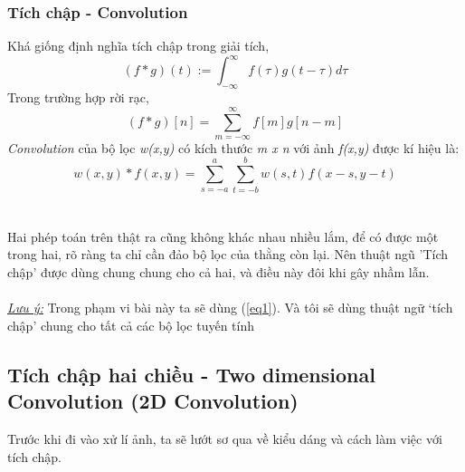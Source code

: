 \documentclass{article}
\begin{document}
        \subsubsection{Tích chập - Convolution}
        Khá giống định nghĩa tích chập trong giải tích, 
        $$(f \ast g)(t):=\int_{-\infty}^{\infty} f(\tau) g(t-\tau) d \tau$$
        Trong trường hợp rời rạc,
        $$(f \ast g)[n]=\sum_{m=-\infty}^{\infty} f[m] g[n-m]$$
        \textit{Convolution} của bộ lọc \textit{w(x,y)} có kích thước \textit{m x n} với ảnh \textit{f(x,y)} được kí hiệu là:
        $$w(x,y) \ast f(x,y) = \sum_{s=-a}^{a}\sum_{t=-b}^{b} w(s,t)f(x-s,y-t)$$
        \\ \\
        Hai phép toán trên thật ra cũng không khác nhau nhiều lắm, để có được một trong hai, rõ ràng ta chỉ cần đảo bộ lọc của thằng còn lại. Nên thuật ngũ 'Tích chập' được dùng chung chung cho cả hai, và điều này đôi khi gây nhầm lẫn.\\ \\
        \underline{\textit{Lưu ý:}} Trong phạm vi bài này ta sẽ dùng (\ref{eq1}). Và tôi sẽ dùng thuật ngữ `tích chập' chung cho tất cả các bộ lọc tuyến tính

        \subsection{Tích chập hai chiều - Two dimensional Convolution (2D Convolution)}
        Trước khi đi vào xử lí ảnh, ta sẽ lướt sơ qua về kiểu dáng và cách làm việc với tích chập.
\end{document}

